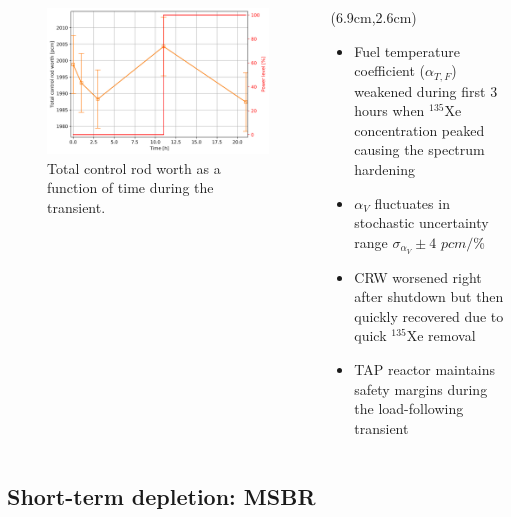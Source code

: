 \begin{frame}
\begin{textblock*}{12.5cm}
\begin{columns}
\begin{figure}[t]
\begin{overprint}
	\includegraphics[width=1.15\linewidth]{../dissertation/figures/ch5/saf_par/crw_evo.png}
	\vspace{-6mm}
	\caption{Total control rod worth as a function of time during the 
	transient.}
			\end{overprint}
		\end{figure}
		
		\column[t]{5.5cm}
		\begin{textblock*}{5.9cm}(6.9cm,2.6cm) %
			\begin{itemize}
				\itemsep=0.8em
				\item<1-> Fuel temperature coefficient ($\alpha_{T,F}$) 
				weakened during first 3 hours when $^{135}$Xe concentration 
				peaked causing the spectrum hardening
				\item<2-> $\alpha_V$ fluctuates in stochastic uncertainty 
				range $\sigma_{\alpha_V}\pm4$ $pcm/$\%
				\item<3-> CRW worsened right after shutdown but then quickly 
				recovered due to quick $^{135}$Xe removal
				\item<4-> TAP reactor maintains safety margins during the 
				load-following transient
			\end{itemize}
				
		\end{textblock*}
	\end{columns}
\end{textblock*}
\end{frame}


\subsection{Short-term depletion: MSBR}

